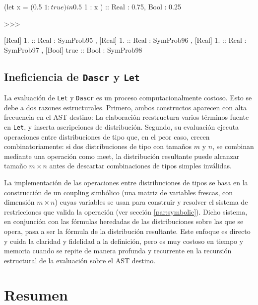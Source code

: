 \begin{gplcblock}[caption={Verificación de tipo de distribución},label={lst:pseudo-comparison}]
(let x = (0.5 $ 1 : true) in  0.5 $ 1 : x ) :: {Real : 0.75, Bool : 0.25}

>>>

{
	 [Real] 1. :: Real : SymProb95 ,
	 [Real] 1. :: Real : SymProb96 ,
	 [Real] 1. :: Real : SymProb97 ,
	 [Bool] true :: Bool : SymProb98 
}  
\end{gplcblock}



\subsection{Ineficiencia de \lstinline|Dascr| y \lstinline|Let|}\label{subsec:lim-eficiencia}

La evaluación de \lstinline|Let| y
\lstinline|Dascr| es un proceso computacionalmente
costoso.  Esto se debe a dos razones
estructurales. Primero, ambos constructos aparecen
con alta frecuencia en el AST destino: La
elaboración reestructura varios términos fuente
en \verb|Let|, y inserta ascripciones de distribución.  Segundo, su evaluación ejecuta
operaciones entre distribuciones de tipo que, en
el peor caso, crecen combinatoriamente: si dos
distribuciones de tipo con tamaños $m$
y $n$, se combinan mediante una operación como
meet, la distribución resultante puede
alcanzar tamaño $m \times n$ antes de descartar
combinaciones de tipos simples inválidas.

La implementación de las operaciones entre
distribuciones de tipos se basa en la construcción
de un coupling simbólico (una matriz de variables
frescas, con dimensión $m\times n$) cuyas variables
se usan para construir y resolver el sistema de
restricciones que valida la operación (ver sección
\ref{par:symbolic}). Dicho sistema, en conjunción
con las fórmulas heredadas de las distribuciones
sobre las que se opera, pasa a ser la fórmula de la
distribución resultante.  Este enfoque es
directo y cuida la claridad y fidelidad a la
definición, pero es muy costoso en tiempo y
memoria cuando se repite de manera profunda y
recurrente en la recursión estructural de la
evaluación sobre el AST destino.



\section{Resumen}

